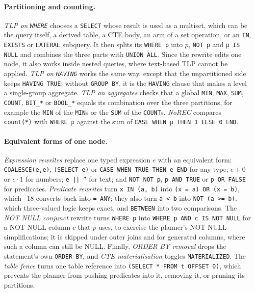 \paragraph{Partitioning and counting.} \emph{TLP on \texttt{WHERE}} chooses a
\texttt{SELECT} whose result is used as a multiset, which can be the query
itself, a derived table, a CTE body, an arm of a set operation, or an
\texttt{IN}, \texttt{EXISTS} or \texttt{LATERAL} subquery. It then splits its
\texttt{WHERE p} into $p$, \texttt{NOT p} and \texttt{p IS NULL} and combines the
three parts with \texttt{UNION ALL}. Since the rewrite edits one node, it also
works inside nested queries, where text-based TLP cannot be applied. \emph{TLP
on \texttt{HAVING}} works the same way, except that the unpartitioned side keeps
\texttt{HAVING TRUE}: without \texttt{GROUP BY}, it is the \texttt{HAVING} clause
that makes a level a single-group aggregate. \emph{TLP on aggregates} checks
that a global \texttt{MIN}, \texttt{MAX}, \texttt{SUM}, \texttt{COUNT},
\texttt{BIT\_*} or \texttt{BOOL\_*} equals its combination over the three
partitions, for example the \texttt{MIN} of the \texttt{MIN}s or the
\texttt{SUM} of the \texttt{COUNT}s. \emph{NoREC} compares \texttt{count(*)}
with \texttt{WHERE p} against the sum of \texttt{CASE WHEN p THEN 1 ELSE 0 END}.

\paragraph{Equivalent forms of one node.} \emph{Expression rewrites} replace one
typed expression $e$ with an equivalent form: \texttt{COALESCE(e,e)},
\texttt{(SELECT e)} or \texttt{CASE WHEN TRUE THEN e END} for any type; $e+0$ or
$e \cdot 1$ for numbers; \texttt{e || ''} for text; and \texttt{NOT NOT p},
\texttt{p AND TRUE} or \texttt{p OR FALSE} for predicates. \emph{Predicate
rewrites} turn \texttt{x IN (a, b)} into \texttt{(x = a) OR (x = b)}, which
\pg~18 converts back into \texttt{= ANY}; they also turn \texttt{a < b} into
\texttt{NOT (a >= b)}, which three-valued logic keeps exact, and
\texttt{BETWEEN} into two comparisons. The \emph{NOT NULL conjunct} rewrite turns
\texttt{WHERE p} into \texttt{WHERE p AND c IS NOT NULL} for a NOT NULL column
$c$ that $p$ uses, to exercise the planner's NOT NULL simplifications; it is
skipped under outer joins and for generated columns, where such a column can
still be NULL. Finally, \emph{ORDER BY removal} drops the statement's own
\texttt{ORDER BY}, and \emph{CTE materialisation} toggles
\texttt{MATERIALIZED}. The \emph{table fence} turns one table reference into
\texttt{(SELECT * FROM t OFFSET 0)}, which prevents the planner from pushing
predicates into it, removing it, or pruning its partitions.

